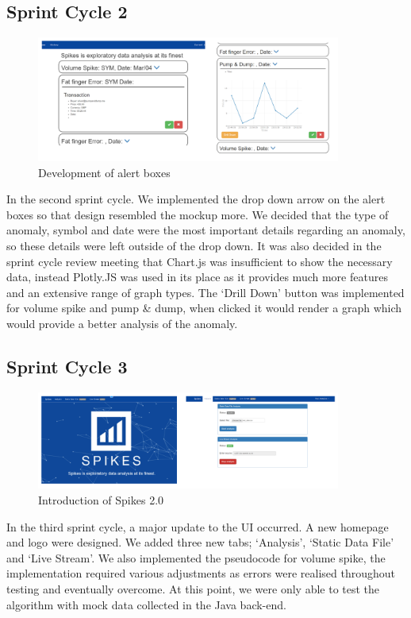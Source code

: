 \documentclass[12pt]{article}
\begin{document}
  \subsection{Sprint Cycle 2}
  \begin{figure}[H]
  \centering
  \includegraphics[width=100mm]{sprint2.png}
  \caption{Development of alert boxes}
  \end{figure}
  In the second sprint cycle. We implemented the drop down arrow on the alert boxes so that design resembled the mockup more. We decided that the type of anomaly, symbol and date were the most important details regarding an anomaly, so these details were left outside of the drop down.
  It was also decided in the sprint cycle review meeting that Chart.js was insufficient to show the necessary data, instead Plotly.JS was used in its place as it provides much more features and an extensive range of graph types.
  The ‘Drill Down’ button was implemented for volume spike and pump \& dump, when clicked it would render a graph which would provide a better analysis of the anomaly.
  \subsection{Sprint Cycle 3}
  \begin{figure}[H]
  \centering
  \includegraphics[width=100mm]{sprint3.png}
  \caption{Introduction of Spikes 2.0}
  \end{figure}
  In the third sprint cycle, a major update to the UI occurred. A new homepage and logo were designed.
  We added three new tabs; ‘Analysis’, ‘Static Data File’ and ‘Live Stream’.
  We also implemented the pseudocode for volume spike, the implementation required various adjustments
  as errors were realised throughout testing and eventually overcome.
  At this point, we were only able to test the algorithm with mock data collected in the Java back-end.
\end{document}
